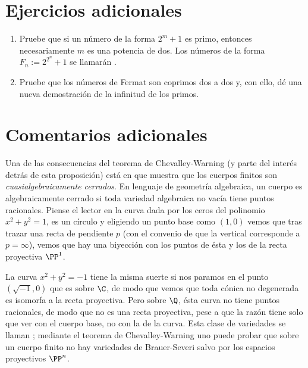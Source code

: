 \documentclass[11pt, reqno]{amsart}
\begin{document}
\begin{additional}
\appendix
\section{Ejercicios adicionales}
\begin{enumerate}
	\item Pruebe que si un número de la forma $2^m + 1$ es primo, entonces necesariamente $m$ es una potencia de dos.
		Los números de la forma $F_n := 2^{2^n} + 1$ se llamarán .

	\item\lookright
		Pruebe que los números de Fermat son coprimos dos a dos y, con ello, dé una nueva demostración de la infinitud de los primos.
\end{enumerate}

\section{Comentarios adicionales}
\lookup
Una de las consecuencias del teorema de Chevalley-Warning (y parte del interés detrás de esta proposición) está en que muestra que los
cuerpos finitos son \emph{cuasialgebraicamente cerrados}.
En lenguaje de geometría algebraica, un cuerpo es algebraicamente cerrado si toda variedad algebraica no vacía tiene puntos racionales.
Piense el lector en la curva dada por los ceros del polinomio $x^2 + y^2 = 1$, es un círculo y eligiendo un punto base como $(1, 0)$ vemos
que tras trazar una recta de pendiente $p$ (con el convenio de que la vertical corresponde a $p = \infty$), vemos que hay una biyección con
los puntos de ésta y los de la recta proyectiva $\PP^1$.

La curva $x^2 + y^2 = -1$ tiene la misma suerte si nos paramos en el punto $(\sqrt{-1}, 0)$ que es  sobre $\C$, de modo
que vemos que toda cónica no degenerada es isomorfa a la recta proyectiva.
Pero sobre $\Q$, ésta curva no tiene puntos racionales, de modo que no es una recta proyectiva, pese a que la razón tiene solo que ver con
el cuerpo base, no con la  de la curva.
Esta clase de variedades se llaman ; mediante el teorema de Chevalley-Warning uno puede probar que sobre un cuerpo
finito no hay variedades de Brauer-Severi salvo por los espacios proyectivos $\PP^n$.

\printbibliography[title={Referencias y lecturas adicionales}]
\end{additional}
\end{document}
